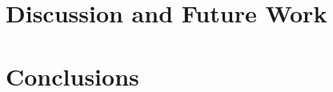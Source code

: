 
\section{Discussion and Future Work}
\label{sec:discussion}


\section{Conclusions}
\label{sec:conclusion}
